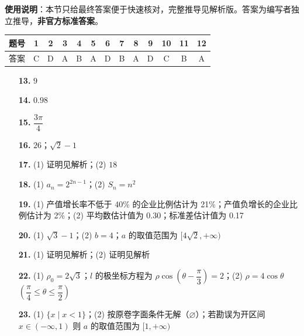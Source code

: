 
\begin{gknotice}
\textbf{使用说明}：本节只给最终答案便于快速核对，完整推导见解析版。答案为编写者独立推导，\textbf{非官方标准答案}。
\end{gknotice}

\begin{center}\begin{tabular}{ccccccccccccc}
\toprule
题号 & 1 & 2 & 3 & 4 & 5 & 6 & 7 & 8 & 9 & 10 & 11 & 12 \\
\midrule
答案 & C & D & A & B & A & D & B & A & D & C & B & A \\
\bottomrule
\end{tabular}\end{center}

\begin{itemize}[leftmargin=2.6em]
  \item[\textbf{13.}] $9$
  \item[\textbf{14.}] $0.98$
  \item[\textbf{15.}] $\dfrac{3\pi}{4}$
  \item[\textbf{16.}] $26$；$\sqrt{2}-1$
\end{itemize}

\begin{itemize}[leftmargin=2.6em]
  \item[\textbf{17.}] (1) 证明见解析；(2) $18$
  \item[\textbf{18.}] (1) $a_n = 2^{2n-1}$；(2) $S_n = n^2$
  \item[\textbf{19.}] (1) 产值增长率不低于 40\% 的企业比例估计为 21\%；产值负增长的企业比例估计为 2\%；(2) 平均数估计值为 0.30；标准差估计值为 0.17
  \item[\textbf{20.}] (1) $\sqrt{3}-1$；(2) $b = 4$；$a$ 的取值范围为 $[4\sqrt{2}, +\infty)$
  \item[\textbf{21.}] (1) 证明见解析；(2) 证明见解析
\end{itemize}

\begin{itemize}[leftmargin=2.6em]
  \item[\textbf{22.}] (1) $\rho_0 = 2\sqrt{3}$；$l$ 的极坐标方程为 $\rho\cos\left(\theta - \dfrac{\pi}{3}\right) = 2$；(2) $\rho = 4\cos\theta$ $\left(\dfrac{\pi}{4} \leqslant \theta \leqslant \dfrac{\pi}{2}\right)$
  \item[\textbf{23.}] (1) $\{x \mid x < 1\}$；(2) 按原卷字面条件无解（$\varnothing$）；若勘误为开区间 $x \in (-\infty, 1)$ 则 $a$ 的取值范围为 $[1, +\infty)$
\end{itemize}
